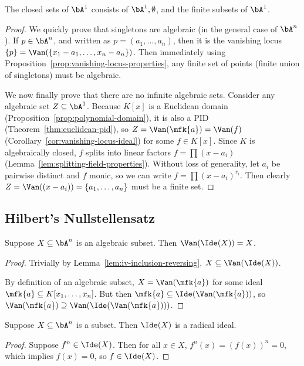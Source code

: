 \begin{lemma}
    The closed sets of \(\bA^1\) consists of \(\bA^1,\emptyset\),
    and the finite subsets of \(\bA^1\).
\end{lemma}
\begin{proof}
    We quickly prove that singletons are algebraic (in the general case of \(\bA^n\)).
    If \(p \in \bA^n\), and written as \(p = (a_1,\hdots,a_n)\),
    then it is the vanishing locus \(\{p\} = \Van(\{x_1-a_1,\hdots,x_n-a_n\})\).
    Then immediately using Proposition~\ref{prop:vanishing-locus-properties},
    any finite set of points (finite union of singletons) must be algebraic.

    We now finally prove that there are no infinite algebraic sets.
    Consider any algebraic set \(Z \subseteq \bA^1\).
    Because \(K[x]\) is a Euclidean domain (Proposition~\ref{prop:polynomial-domain}),
    it is also a PID (Theorem~\ref{thm:euclidean-pid}),
    so \(Z = \Van(\mfk{a}) = \Van(f)\) (Corollary~\ref{cor:vanishing-locus-ideal})
    for some \(f \in K[x]\).
    Since \(K\) is algebraically closed,
    \(f\) splits into linear factors \(f = \prod (x-a_i)\) (Lemma~\ref{lem:splitting-field-properties}).
    Without loss of generality, let \(a_i\) be pairwise distinct and \(f\) monic,
    so we can write \(f = \prod {(x-a_i)}^{r_i}\).
    Then clearly \(Z = \Van((x-a_i)) = \{a_1,\hdots,a_n\}\) must be a finite set.
\end{proof}

\subsection*{Hilbert's Nullstellensatz}

\begin{lemma}\label{lem:vix-x}
    Suppose \(X \subseteq \bA^n\) is an algebraic subset.
    Then \(\Van(\Ide(X)) = X\).
\end{lemma}
\begin{proof}
    Trivially by Lemma~\ref{lem:iv-inclusion-reversing},
    \(X \subseteq \Van(\Ide(X))\).

    By definition of an algebraic subset,
    \(X = \Van(\mfk{a})\) for some ideal \(\mfk{a} \subseteq K[x_1,\hdots,x_n]\).
    But then \(\mfk{a} \subseteq \Ide(\Van(\mfk{a}))\),
    so \(\Van(\mfk{a}) \supseteq \Van(\Ide(\Van(\mfk{a})))\).
\end{proof}
\begin{lemma}\label{lem:ix-radical}
    Suppose \(X \subseteq \bA^n\) is a subset.
    Then \(\Ide(X)\) is a radical ideal.
\end{lemma}
\begin{proof}
    Suppose \(f^n \in \Ide(X)\).
    Then for all \(x \in X\), \(f^n(x) = {(f(x))}^n = 0\),
    which implies \(f(x) = 0\), so \(f \in \Ide(X)\).
\end{proof}

